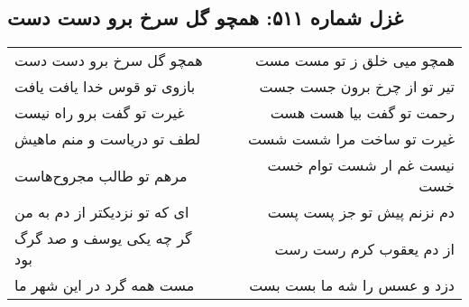 \begin{center}
\section*{غزل شماره ۵۱۱: همچو گل سرخ برو دست دست}
\label{sec:0511}
\begin{longtable}{l p{0.5cm} r}
همچو گل سرخ برو دست دست
&&
همچو میی خلق ز تو مست مست
\\
بازوی تو قوس خدا یافت یافت
&&
تیر تو از چرخ برون جست جست
\\
غیرت تو گفت برو راه نیست
&&
رحمت تو گفت بیا هست هست
\\
لطف تو دریاست و منم ماهیش
&&
غیرت تو ساخت مرا شست شست
\\
مرهم تو طالب مجروح‌هاست
&&
نیست غم ار شست توام خست خست
\\
ای که تو نزدیکتر از دم به من
&&
دم نزنم پیش تو جز پست پست
\\
گر چه یکی یوسف و صد گرگ بود
&&
از دم یعقوب کرم رست رست
\\
مست همه گرد در این شهر ما
&&
دزد و عسس را شه ما بست بست
\\
\end{longtable}
\end{center}

